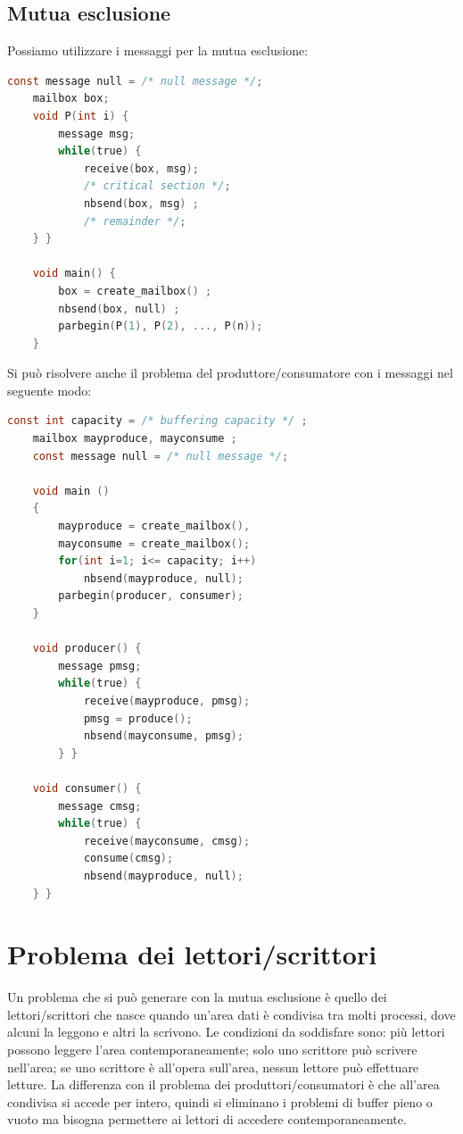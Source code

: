 \subsection*{Mutua esclusione}
Possiamo utilizzare i messaggi per la mutua esclusione:
\begin{lstlisting}[language=C]
    const message null = /* null message */;
    mailbox box;
    void P(int i) {
        message msg;
        while(true) {
            receive(box, msg);
            /* critical section */;
            nbsend(box, msg) ;
            /* remainder */;
    } }

    void main() {
        box = create_mailbox() ;
        nbsend(box, null) ;
        parbegin(P(1), P(2), ..., P(n));
    }
\end{lstlisting}

Si può risolvere anche il problema del produttore/consumatore con i messaggi nel seguente modo:
\begin{lstlisting}[language=C]
    const int capacity = /* buffering capacity */ ;
    mailbox mayproduce, mayconsume ;
    const message null = /* null message */;
    
    void main ()
    {
        mayproduce = create_mailbox(),
        mayconsume = create_mailbox();
        for(int i=1; i<= capacity; i++)
            nbsend(mayproduce, null);
        parbegin(producer, consumer);
    }
    
    void producer() {
        message pmsg;
        while(true) {
            receive(mayproduce, pmsg);
            pmsg = produce();
            nbsend(mayconsume, pmsg);
        } }

    void consumer() {
        message cmsg;
        while(true) {
            receive(mayconsume, cmsg);
            consume(cmsg);
            nbsend(mayproduce, null);
    } }
\end{lstlisting}

\section{Problema dei lettori/scrittori}
Un problema che si può generare con la mutua esclusione è quello dei lettori/scrittori che nasce quando un'area dati è condivisa tra molti processi, dove alcuni la leggono e altri la scrivono. Le condizioni da soddisfare sono: più lettori possono leggere l'area contemporaneamente; solo uno scrittore può scrivere nell'area; se uno scrittore è all'opera sull'area, nessun lettore può effettuare letture. La differenza con il problema dei produttori/consumatori è che all'area condivisa si accede per intero, quindi si eliminano i problemi di buffer pieno o vuoto ma bisogna permettere ai lettori di accedere contemporaneamente. 

